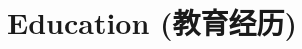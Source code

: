 \documentclass[paper=a4,fontsize=11pt]{scrartcl}
\begin{document}
\begin{longtable}{r|p{12cm}}
%
	

\end{longtable}

\section*{Education (教育经历)}
\end{document}
